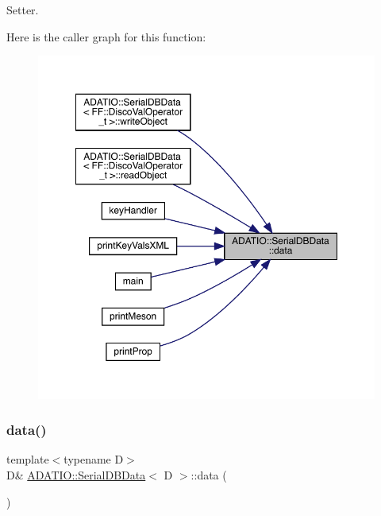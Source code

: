 Setter. 

Here is the caller graph for this function\+:
\nopagebreak
\begin{figure}[H]
\begin{center}
\leavevmode
\includegraphics[width=350pt]{d1/d98/classADATIO_1_1SerialDBData_af4a3864baddbecbc6177f164f8a1f664_icgraph}
\end{center}
\end{figure}
\mbox{\label{classADATIO_1_1SerialDBData_af4a3864baddbecbc6177f164f8a1f664}} 
\subsubsection{\texorpdfstring{data()}{data()}\hspace{0.1cm}{\footnotesize\ttfamily [2/6]}}
{\footnotesize\ttfamily template$<$typename D$>$ \\
D\& \mbox{\hyperlink{classADATIO_1_1SerialDBData}{A\+D\+A\+T\+I\+O\+::\+Serial\+D\+B\+Data}}$<$ D $>$\+::data (\begin{DoxyParamCaption}{ }\end{DoxyParamCaption})\hspace{0.3cm}{\ttfamily [inline]}}




